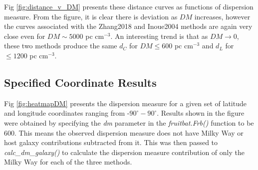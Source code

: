 \documentclass{article}
\begin{document}
Fig \ref{fig:distance_v_DM} presents these distance curves as functions of dispersion measure. From the figure, it is clear there is deviation as $DM$ increases, however the curves associated with the Zhang2018 and Inoue2004 methods are again very close even for $DM\sim5000$ pc cm$^{-3}$. An interesting trend is that as $DM\rightarrow0$,  these two methods produce the same $d_C$ for $DM \leqslant 600$ pc cm$^{-3}$ and $d_L$ for $\leqslant 1200$ pc cm$^{-3}$.

\subsection{Specified Coordinate Results}

Fig \ref{fig:heatmapDM} presents the dispersion measure for a given set of latitude and longitude coordinates ranging from -$90^\circ-90^\circ$. Results shown in the figure were obtained by specifying the \emph{dm} parameter in the \emph{fruitbat.Frb()} function to be 600. This means the observed dispersion measure does not have Milky Way or host galaxy contributions subtracted from it. This was then passed to \emph{calc\_dm\_galaxy()} to calculate the dispersion measure contribution of only the Milky Way for each of the three methods.
\end{document}
